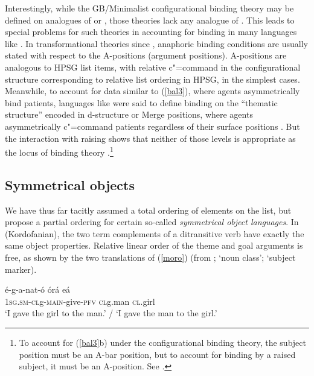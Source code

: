 \documentclass[output=paper
 	        ,biblatex
                ,babelshorthands
                ,newtxmath
                ,draftmode
                ,colorlinks, citecolor=brown
]{langscibook}
\begin{document}
Interestingly, while the GB/Minimalist configurational binding theory may be defined on analogues of
 or \content, those theories lack any analogue of \argst.  This leads to special problems for
such theories in accounting for binding in many  languages like .
In transformational theories since \citet{Chomsky:1981}, anaphoric binding conditions are usually
stated with respect to the A-positions (argument positions).  A-positions are analogous to HPSG
 list items, with relative c"=command in the configurational structure corresponding to relative
list ordering in HPSG, in the simplest cases.  Meanwhile, to account for data similar to
(\ref{bal3}), where agents asymmetrically bind patients,  languages like
 were said to define binding on the ``thematic structure'' encoded in d-structure or
Merge positions, where agents asymmetrically c"=command patients regardless of their surface
positions \citep{Guilfoyle+etal:1992}.  But the interaction with raising shows that neither of those
levels is appropriate as the locus of binding theory \citep{Wechsler1999}.\footnote{To account for
  (\ref{bal3}b) under the configurational binding theory, the subject position must be an A-bar
  position, but to account for binding by a raised subject, it must be an A-position.  See
  \citet{Wechsler1999}. }
%

\subsection{Symmetrical objects}

We have thus far tacitly assumed a total ordering of elements on the \argst list, but
\citet*{AMM2013a,Ackermanetal2017} propose a partial ordering  for certain so-called \emph{symmetrical object languages}.  In  (Kordofanian), the
two term complements of a ditransitive verb have exactly the same object
properties.  Relative linear order of the theme and goal arguments is free, as shown by the two
translations of (\ref{moro}) (from \citealt[9]{Ackermanetal2017};  `noun class'; 
`subject marker).


\begin{exe}
	\ex\label{moro}
\gll   \'{e}-g-a-nat-\'{o} \'{o}r\'{a}  e\'{a}  \\
        1\textsc{sg.sm-cl}g-\textsc{main}-give-\textsc{pfv}    \textsc{cl}g.man \textsc{cl}.girl \\
\glt `I gave the girl to the man.’ / `I gave the man to the girl.’
\end{exe} 
\end{document}
